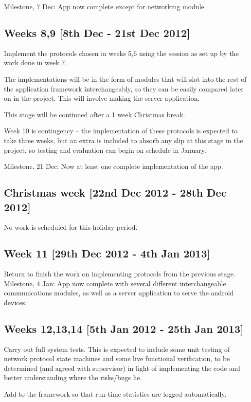 \documentclass[12pt,twoside,notitlepage]{report}
\begin{document}
Milestone, 7 Dec: App now complete except for networking module.

\subsection*{Weeks 8,9 [8th Dec - 21st Dec 2012]}
Implement the protocols chosen in weeks 5,6 using the session as set up by the work done in week 7.

The implementations will be in the form of modules that will slot into the rest of the application framework interchangeably, so they can be easily compared later on in the project.  This will involve making the server application.

This stage will be continued after a 1 week Christmas break.

Week 10 is contingency -- the implementation of these protocols is expected to take three weeks, but an extra is included to absorb any slip at this stage in the project, so testing and evaluation can begin on schedule in January.

Milestone, 21 Dec: Now at least one complete implementation of the app.

\subsection*{Christmas week [22nd Dec 2012 - 28th Dec 2012]}
No work is scheduled for this holiday period.

\subsection*{Week 11 [29th Dec 2012 - 4th Jan 2013]}
Return to finish the work on implementing protocols from the previous stage.
Milestone, 4 Jan: App now complete with several different interchangeable communications modules, as well as a server application to serve the android devices.

\subsection*{Weeks 12,13,14 [5th Jan 2012 - 25th Jan 2013]}
Carry out full system tests.  This is expected to include some unit testing of network protocol state machines and some live functional verification, to be determined (and agreed with supervisor) in light of implementing the code and better understanding where the risks/bugs lie.

Add to the framework so that run-time statistics are logged automatically.
\end{document}
